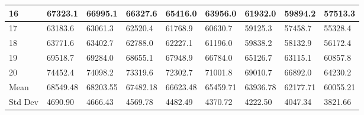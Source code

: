 \documentclass{article}
\begin{document}
\begin{table}[!htbp]
{\begin{tabular}{ |p{3cm}|| p{3cm} | p{3cm} | p{3cm} | p{3cm} | p{3cm} | p{3cm} | p{3cm} | p{3cm}| }
\hline
 16 & 67323.1 & 66995.1 & 66327.6 & 65416.0 & 63956.0 & 61932.0 & 59894.2 & 57513.3 \\ 
\hline
 17 & 63183.6 & 63061.3 & 62520.4 & 61768.9 & 60630.7 & 59125.3 & 57458.7 & 55328.4 \\ 
\hline
 18 & 63771.6 & 63402.7 & 62788.0 & 62227.1 & 61196.0 & 59838.2 & 58132.9 & 56172.4 \\ 
\hline
 19 & 69518.7 & 69284.0 & 68655.1 & 67948.9 & 66784.0 & 65126.7 & 63115.1 & 60857.8 \\ 
\hline
 20 & 74452.4 & 74098.2 & 73319.6 & 72302.7 & 71001.8 & 69010.7 & 66892.0 & 64230.2 \\ 
\hline
Mean & 68549.48 & 68203.55 & 67482.18 & 66623.48 & 65459.71 & 63936.78 & 62177.71 & 60055.21 \\ 
\hline
Std Dev & 4690.90 & 4666.43 & 4569.78 & 4482.49 & 4370.72 & 4222.50 & 4047.34 & 3821.66 \\ 
\hline
\end{tabular}%
}
\end{table}
\end{document}
